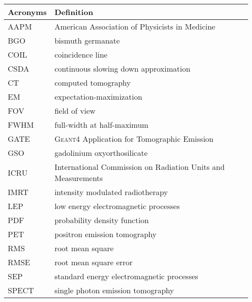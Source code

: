 \begin{center}
\begin{longtable}{ll}
  \hline
  \textbf{Acronyms} & \textbf{Definition} \\
  \hline\hline
  AAPM	&	American Association of Physicists in Medicine	\\
BGO	&	bismuth germanate	\\
COIL	&	coincidence line	\\
CSDA	&	continuous slowing down approximation	\\
CT	&	computed tomography	\\
EM	&	expectation-maximization	\\
FOV	&	field of view	\\
FWHM	&	full-width at half-maximum	\\
GATE	&	\textsc{Geant4} Application for Tomographic Emission	\\
GSO	&	gadolinium oxyorthosilicate	\\
ICRU	&	International Commission on Radiation Units and Measurements	\\
IMRT	&	intensity modulated radiotherapy	\\
LEP	&	low energy electromagnetic processes	\\
PDF	&	probability density function	\\
PET	&	positron emission tomography	\\
RMS	&	root mean square	\\
RMSE	&	root mean square error	\\
SEP	&	standard energy electromagnetic processes	\\
SPECT	&	single photon emission tomography	\\
  \hline
\end{longtable}
\end{center}

